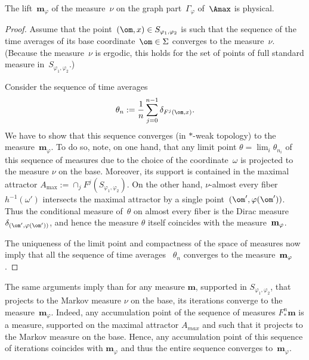 \documentclass[a4paper,12pt]{amsart}
\begin{document}
\begin{Prop}    \label{p:SRB}
The lift~$\mathbf{m}_{\varphi}$ of the measure~$\nu$ on the graph part~$\Gamma_{\varphi}$ of~$\Amax$ is physical.
\end{Prop}
\begin{proof}
Assume that the point~$(\om,x)\in S_{\varphi_1,\varphi_2}$ is such that the sequence of the time averages of its base coordinate~$\om\in\Sigma$ converges to the measure~$\nu$. (Because the measure~$\nu$ is ergodic, this holds for the set of points of full standard measure in~$S_{\varphi_1,\varphi_2}$.)

Consider the sequence of time averages
$$
\theta_n:=\frac{1}{n} \sum_{j=0}^{n-1} \delta_{F^j(\om,x)}.
$$
We have to show that this sequence converges (in $*$-weak topology) to the measure~$\mathbf{m}_{\varphi}$. To do so, note, on one hand, that any limit point $\theta=\lim_i \theta_{n_i}$ of this sequence of measures due to the choice of the coordinate~$\omega$ is projected to the measure $\nu$ on the base. Moreover, its support is contained in the maximal attractor $A_{\max}:=\cap_{j} F^{j}(S_{\varphi_1,\varphi_2})$. On the other hand, $\nu$-almost every fiber $h^{-1}(\omega')$ intersects the maximal attractor by a single point~$(\om', \varphi(\om'))$. Thus the conditional measure of~$\theta$ on almost every fiber is the Dirac measure~$\delta_{(\om', \varphi(\om'))}$, and hence the measure $\theta$ itself coincides with the measure~$\bf{m}_{\varphi}$.

The uniqueness of the limit point and compactness of the space of measures now imply that all the sequence of time averages~ $\theta_n$ converges to the measure~$\bf{m}_{\varphi}$.
\end{proof}
\begin{Rem}\label{r:lim}
The same arguments imply than for any measure $\textbf{m}$, supported in $S_{\varphi_1,\varphi_2}$, that projects to the Markov measure $\nu$ on the base, its iterations converge to the measure~$\mathbf{m}_{\varphi}$. Indeed, any accumulation point of the sequence of measures $F_*^n \mathbf{m}$ is a measure, supported on the maximal attractor $A_{max}$ and such that it projects to the Markov measure on the base. Hence, any accumulation point of this sequence of iterations coincides with $\mathbf{m}_{\varphi}$ and thus the entire sequence converges to~$\mathbf{m}_{\varphi}$.
\end{Rem}
\end{document}
